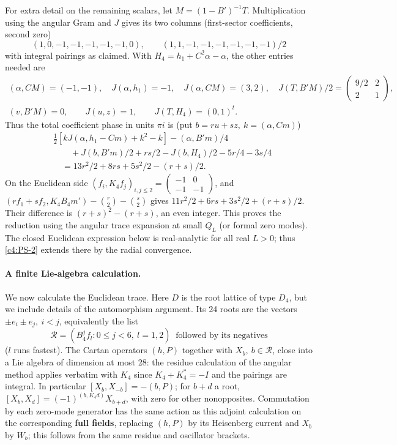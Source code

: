 For extra detail on the remaining scalars, let \(M=(1-B')^{-1}T\). Multiplication using the angular Gram and \(J\) gives its two columns (first-sector coefficients, second zero)
\[
 (1,0,-1,-1,-1,-1,-1,0),\qquad (1,1,-1,-1,-1,-1,-1,-1)/2
\]
with integral pairings as claimed. With \(H_4=h_1+C^2\alpha-\alpha\), the other entries needed are
\[
 \begin{gathered}
 (\alpha,CM)=(-1,-1),\quad J(\alpha,h_1)=-1,\quad J(\alpha,CM)=(3,2),
 \quad J(T,B'M)/2=\begin{pmatrix}9/2&2\\2&1\end{pmatrix},\\
 (v,B'M)=0,\qquad J(u,z)=1,\qquad J(T,H_4)=(0,1)^t .
 \end{gathered}
\]
Thus the total coefficient phase in units \(\pi i\) is (put \(b=r u+s z,\ k=(\alpha,Cm)\))
\[
\begin{aligned}
 &\tfrac12[kJ(\alpha,h_1-Cm)+k^2-k]-(\alpha,B'm)/4\\
 &\qquad{}+J(b,B'm)/2+rs/2-J(b,H_4)/2-5r/4-3s/4\\
 &\quad=13r^2/2+8rs+5s^2/2-(r+s)/2 .
\end{aligned}
\]
On the Euclidean side \((f_i,K_4 f_j)_{i,j\le2}=\left(\begin{smallmatrix}-1&0\\-1&-1\end{smallmatrix}\right)\), and \((r f_1+s f_2,K_4 B_4 m')-\binom r2-\binom s2\) gives \(11r^2/2+6rs+3s^2/2+(r+s)/2\). Their difference is \((r+s)^2-(r+s)\), an even integer. This proves the reduction using the angular trace expansion at small \(Q_L\) (or formal zero modes). The closed Euclidean expression below is real-analytic for all real \(L>0\); thus \eqref{c4:PS-2} extends there by the radial convergence.

\paragraph{A finite Lie-algebra calculation.} We now calculate the Euclidean trace. Here \(D\) is the root lattice of type \(D_4\), but we include details of the automorphism argument. Its 24 roots are the vectors \(\pm e_i\pm e_j,\ i<j\), equivalently the list
\[
 \mathcal R=(B_4^j f_l:0\le j<6,\ l=1,2)\ \text{ followed by its negatives}
\]
(\(l\) runs fastest). The Cartan operators \((h,P)\) together with \(X_b,\ b\in\mathcal R\), close into a Lie algebra of dimension at most 28: the residue calculation of the angular method applies verbatim with \(K_4\) since \(K_4+K_4^*=-I\) and the pairings are integral. In particular \([X_b,X_{-b}]=-(b,P)\); for \(b+d\) a root, \([X_b,X_d]=(-1)^{(b,K_4 d)}X_{b+d}\), with zero for other nonopposites. Commutation by each zero-mode generator has the same action as this adjoint calculation on the corresponding \textbf{full fields}, replacing \((h,P)\) by its Heisenberg current and \(X_b\) by \(W_b\); this follows from the same residue and oscillator brackets.

